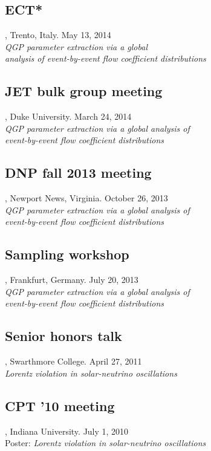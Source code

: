 \documentclass[letterpaper,10pt]{article}
\begin{document}
\subsection{ECT*}, Trento, Italy. \hfill May 13, 2014 \\
\emph{QGP parameter extraction via a global \\ analysis of event-by-event flow coefficient distributions}

\subsection{JET bulk group meeting}, Duke University. \hfill March 24, 2014 \\
\emph{QGP parameter extraction via a global analysis of \\ event-by-event flow coefficient distributions}

\subsection{DNP fall 2013 meeting}, Newport News, Virginia. \hfill October 26, 2013 \\
\emph{QGP parameter extraction via a global analysis of \\ event-by-event flow coefficient distributions}

\subsection{Sampling workshop}, Frankfurt, Germany. \hfill July 20, 2013 \\
\emph{QGP parameter extraction via a global analysis of \\ event-by-event flow coefficient distributions}

\subsection{Senior honors talk}, Swarthmore College. \hfill April 27, 2011 \\
\emph{Lorentz violation in solar-neutrino oscillations}

\subsection{CPT '10 meeting}, Indiana University. \hfill July 1, 2010 \\
Poster: \emph{Lorentz violation in solar-neutrino oscillations}
\end{document}
